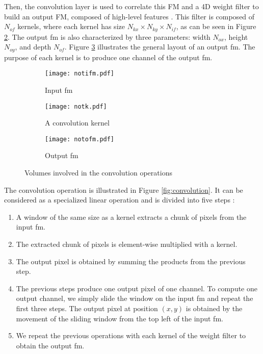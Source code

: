 Then, the convolution layer is used to correlate this FM and a 4D weight filter to build an output FM, composed of high-level features \cite{zhao_towards_2018}.
This filter is composed of $N_{of}$ kernels, where each kernel has size $N_{kx} \times N_{ky} \times N_{if}$, as can be seen in Figure \ref{fig:notation:k}. The output \acrshort{fm} is also characterized by three parameters: width $N_{ox}$, height $N_{oy}$, and depth $N_{of}$. Figure \ref{fig:notation:ofm} illustrates the general layout of an output \acrshort{fm}. The purpose of each kernel is to produce one channel of the output \acrshort{fm}.
%
\begin{figure}[H]
    \centering
    \begin{subfigure}[t]{.32\textwidth}
    \centering
    \texttt{[image: notifm.pdf]}
    \caption{Input \acrshort{fm}}
    \label{fig:notation:ifm}
    \end{subfigure}
    \begin{subfigure}[t]{.32\textwidth}
    \centering
    \texttt{[image: notk.pdf]}
    \caption{A convolution kernel}
    \label{fig:notation:k}
    \end{subfigure}
    \begin{subfigure}[t]{.32\textwidth}
    \centering
    \texttt{[image: notofm.pdf]}
    \caption{Output \acrshort{fm}}
    \label{fig:notation:ofm}
    \end{subfigure}
    \caption{Volumes involved in the convolution operations}
    \label{fig:notconv}
\end{figure}
%
The convolution operation is illustrated in Figure \ref{fig:convolution}. It can be considered as a specialized linear operation and is divided into five steps \cite{matteucci_artificial_2019, zhu_efficient_2020}:
%
\begin{enumerate}
    \item A window of the same size as a kernel extracts a chunk of pixels from the input \acrshort{fm}.
    \item The extracted chunk of pixels is element-wise multiplied with a kernel.
    \item The output pixel is obtained by summing the products from the previous step.
    \item The previous steps produce one output pixel of one channel. To compute one output channel, we simply slide the window on the input \acrshort{fm} and repeat the first three steps. The output pixel at position $(x, y)$ is obtained by the movement of the sliding window from the top left of the input \acrshort{fm}. 
    \item We repeat the previous operations with each kernel of the weight filter to obtain the output \acrshort{fm}.
\end{enumerate}
